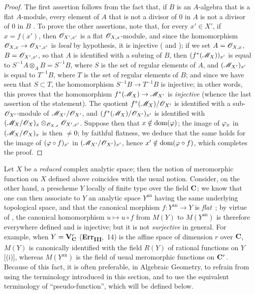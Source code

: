 \begin{proof}
The first assertion follows from the fact that, if $B$ is an $A$-algebra that is a flat $A$-module, every element of $A$ that is not a divisor of $0$ in $A$ is not a divisor of $0$ in $B$ .
To prove the other assertions, note that, for every $x'\in X'$, if $x=f(x')$, then $\mathscr{O}_{X',x'}$ is a flat $\mathscr{O}_{X,x}$-module, and since the homomorphism $\mathscr{O}_{X,x}\to\mathscr{O}_{X',x'}$ is \emph{local} by hypothesis, it is injective ( and ); if we set $A=\mathscr{O}_{X,x}$, $B=\mathscr{O}_{X',x'}$, so that $A$ is identified with a subring of $B$, then $(f^*(\mathscr{M}_X))_{x'}$ is equal to $S^{-1}A\otimes_A B=S^{-1}B$, where $S$ is the set of regular elements of $A$, and $(\mathscr{M}_{X'})_{x'}$ is equal to $T^{-1}B$, where $T$ is the set
of regular elements of $B$; and since we have seen that $S\subset T$, the homomorphism $S^{-1}B\to T^{-1}B$ is injective; in other words, this proves that the homomorphism  $f^*(\mathscr{M}_X)\to\mathscr{M}_{X'}$ is \emph{injective} (whence the last assertion of the statement).
The quotient $f^*(\mathscr{M}_X)/\mathscr{O}_{X'}$ is identified with a sub-$\mathscr{O}_{X'}$-module of $\mathscr{M}_{X'}/\mathscr{O}_{X'}$, and $(f^*(\mathscr{M}_X)/\mathscr{O}_{X'})_{x'}$ is identified with $(\mathscr{M}_X/\mathscr{O}_X)_x\otimes_{\mathscr{O}_{X,x}}\mathscr{O}_{X',x'}$.
Suppose then that $x\notin\operatorname{dom}(\varphi)$; the image of $\varphi_x$ in $(\mathscr{M}_X/\mathscr{O}_X)_x$ is then $\neq0$; by faithful flatness, we deduce that the same holds for the image of $(\varphi\circ f)_{x'}$ in $(\mathscr{M}_{X'}/\mathscr{O}_{X'})_{x'}$, hence $x'\notin\operatorname{dom}(\varphi\circ f)$, which completes the proof.
\end{proof}

\begin{remark}[20.1.13]
\label{IV.20.1.13}
Let $X$ be a \emph{reduced} complex analytic space; then the notion of meromorphic function on $X$ defined above coincides with the usual notion.
Consider, on the other hand, a prescheme $Y$ locally of finite type over the field $\mathbf{C}$; we know that one can then associate to $Y$ an analytic space $Y^\mathrm{an}$ having the same underlying topological space, and that the canonical morphism $f:Y^\mathrm{an}\to Y$ is \emph{flat}~\cite{IV-37}; by virtue of , the canonical homomorphism $u\mapsto u\circ f$ from $M(Y)$ to $M(Y^\mathrm{an})$ is therefore everywhere defined and is injective; but it is not \emph{surjective} in general.
For example, when $Y=\mathbf{V}_{\mathbf{C}}^r$ (\textbf{Err}\textsubscript{\textbf{III}},~14) is the affine space of dimension $r$ over $\mathbf{C}$, $M(Y)$ is canonically identified with the field $R(Y)$ of rational functions on $Y$ [(i)], whereas $M(Y^\mathrm{an})$ is the field of usual meromorphic functions on $\mathbf{C}^r$.
Because of this fact, it is often preferable, in Algebraic Geometry, to refrain from using the terminology introduced in this section, and to use the equivalent terminology of ``pseudo-function'', which will be defined below.
\end{remark}



